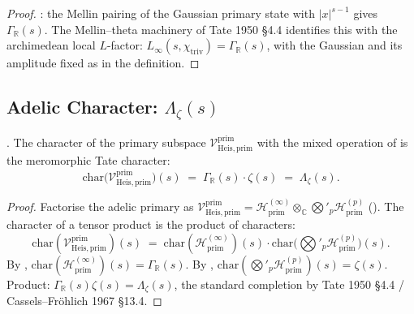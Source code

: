 \begin{proof}
: the Mellin pairing of the
Gaussian primary state with \(|x|^{s-1}\) gives \(\Gamma_{\mathbb{R}}(s)\).
The Mellin--theta machinery of Tate 1950 \S4.4 identifies this with
the archimedean local \(L\)-factor: \(L_{\infty}(s,\chi_{\mathrm{triv}})=\Gamma_{\mathbb{R}}(s)\),
with the Gaussian and its amplitude fixed as in the definition.
\end{proof}

\subsection{Adelic Character: \(\Lambda_{\zeta}(s)\)}
\label{v4-arith:prim-zeta:adelic-char}

\begin{theorem}
\label{v4-arith:prim-zeta:thm:adelic-char}
\ClaimStatusProvedHere. The character of the primary subspace
\(\mathcal{V}^{\mathrm{prim}}_{\mathrm{Heis},\mathrm{prim}}\) with the mixed operation of 
is the meromorphic Tate character:
\begin{equation}
\label{v4-arith:prim-zeta:eq:adelic-char}
\mathrm{char}\bigl(\mathcal{V}^{\mathrm{prim}}_{\mathrm{Heis},\mathrm{prim}}\bigr)(s)
\;=\;\Gamma_{\mathbb{R}}(s)\cdot\zeta(s)\;=\;\Lambda_{\zeta}(s).
\end{equation}
\end{theorem}

\begin{proof}
Factorise the adelic primary as
\(\mathcal{V}^{\mathrm{prim}}_{\mathrm{Heis},\mathrm{prim}}=\mathcal{H}^{(\infty)}_{\mathrm{prim}}\otimes_{\mathbb{C}}\bigotimes'_{p}\mathcal{H}^{(p)}_{\mathrm{prim}}\)
(). The character of
a tensor product is the product of characters:
\begin{equation}
\mathrm{char}(\mathcal{V}^{\mathrm{prim}}_{\mathrm{Heis},\mathrm{prim}})(s)
\;=\;\mathrm{char}(\mathcal{H}^{(\infty)}_{\mathrm{prim}})(s)\cdot\mathrm{char}\bigl(\bigotimes'_{p}\mathcal{H}^{(p)}_{\mathrm{prim}}\bigr)(s).
\end{equation}
By ,
\(\mathrm{char}(\mathcal{H}^{(\infty)}_{\mathrm{prim}})(s)=\Gamma_{\mathbb{R}}(s)\).
By ,
\(\mathrm{char}(\bigotimes'_{p}\mathcal{H}^{(p)}_{\mathrm{prim}})(s)=\zeta(s)\).
Product: \(\Gamma_{\mathbb{R}}(s)\zeta(s)=\Lambda_{\zeta}(s)\), the standard
completion by Tate 1950 \S4.4 / Cassels--Fr\"ohlich 1967 \S13.4.
\end{proof}

